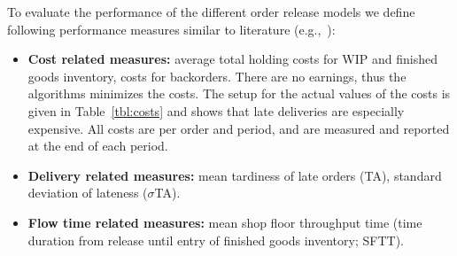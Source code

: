 \documentclass[envcountsame]{llncs}
\newcommand{\SH}[1]{\begin{center} \textcolor{green!50!black}{#1} \end{center}}
\begin{document}
To evaluate the performance of the different order release models we define
following performance measures similar to literature
(e.g.,~\citealt{Baykasoglu2011,Thuerer2012}):
\begin{itemize}
\item \textbf{Cost related measures:} average total holding costs for  WIP and finished goods inventory,
  costs for backorders. There are no earnings,
  thus the algorithms minimizes the costs. The setup for the actual values of the costs is given in
  Table~\ref{tbl:costs} and shows that late deliveries are especially expensive. All costs are per
  order and period, and are measured and reported at the end of each period.



\item \textbf{Delivery related measures:} %
  mean tardiness of late orders (TA), standard deviation of
  lateness ($\sigma$TA).
\item \textbf{Flow time related measures:} mean shop floor throughput time (time
  duration from release until entry of finished goods inventory; SFTT).
\end{itemize}
\end{document}
